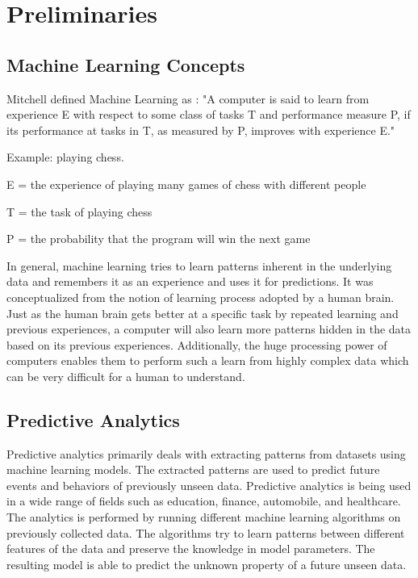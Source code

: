 \documentclass[11pt,openright]{report}
\begin{document}
\section{Preliminaries}\label{section:preliminaries}

\subsection{Machine Learning Concepts}

\noindent  Mitchell defined Machine Learning as \cite{Mitchell1997}: 
\newline\newline
\hangindent=0.7cm "A computer is said to learn from experience E with respect to some class of tasks T and performance measure P, if its performance at tasks in T, as measured by P, improves with experience E." \newline 

\noindent Example: playing chess.

\noindent E = the experience of playing many games of chess with different people

\noindent T = the task of playing chess

\noindent P = the probability that the program will win the next game \newline 

\noindent In general, machine learning tries to learn patterns inherent in the underlying data and remembers it as an experience and uses it for predictions. It was conceptualized from the notion of learning process adopted by a human brain. Just as the human brain gets better at a specific task by repeated learning and previous experiences, a computer will also learn more patterns hidden in the data based on its previous experiences. Additionally, the huge processing power of computers enables them to perform such a learn from highly complex data which can be very difficult for a human to understand. 

\subsection{Predictive Analytics}
Predictive analytics primarily deals with extracting patterns from datasets using machine learning models. The extracted patterns are used to predict future events and behaviors of previously unseen data. Predictive analytics is being used in a wide range of fields such as education, finance, automobile, and healthcare. The analytics is performed by running different machine learning algorithms on previously collected data. The algorithms try to learn patterns between different features of the data and preserve the knowledge in model parameters. The resulting model is able to predict the unknown property of a future unseen data. 
\end{document}
